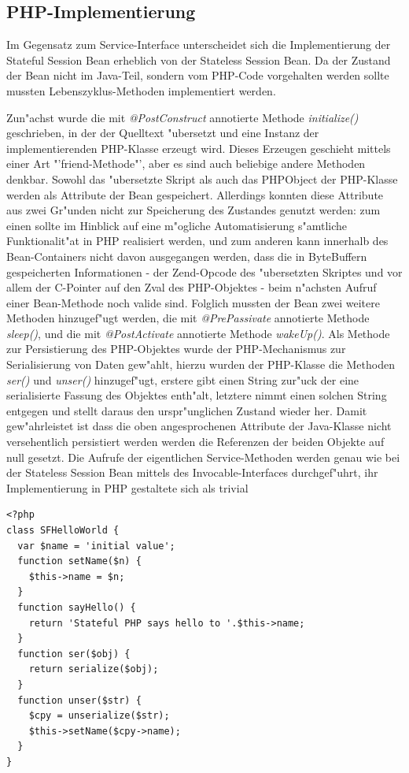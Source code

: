 \subsection{PHP-Implementierung}
\label{sec:chap2:sfsb:impl}

Im Gegensatz zum Service-Interface unterscheidet sich die Implementierung der Stateful Session Bean erheblich von der
Stateless Session Bean. Da der Zustand der Bean nicht im Java-Teil, sondern vom PHP-Code vorgehalten werden sollte
mussten Lebenszyklus-Methoden implementiert werden.

Zun"achst wurde die mit \emph{@PostConstruct} annotierte Methode \emph{initialize()} geschrieben, in der der Quelltext
"ubersetzt und eine Instanz der implementierenden PHP-Klasse erzeugt wird. Dieses Erzeugen geschieht mittels einer
Art "'friend-Methode"', aber es sind auch beliebige andere Methoden denkbar.
Sowohl das "ubersetzte Skript als auch das PHPObject der PHP-Klasse werden als Attribute der Bean gespeichert. 
Allerdings konnten diese Attribute aus zwei
Gr"unden nicht zur Speicherung des Zustandes genutzt werden: zum einen sollte im Hinblick auf eine m"ogliche
Automatisierung s"amtliche Funktionalit"at in PHP realisiert werden, und zum anderen kann innerhalb des Bean-Containers
nicht davon ausgegangen werden, dass die in ByteBuffern gespeicherten Informationen - der Zend-Opcode des "ubersetzten
Skriptes und vor allem der C-Pointer auf den Zval des PHP-Objektes - beim n"achsten Aufruf einer Bean-Methode noch valide 
sind. Folglich mussten der Bean zwei weitere Methoden hinzugef"ugt werden, die mit \emph{@PrePassivate} annotierte Methode
\emph{sleep()}, und die mit \emph{@PostActivate} annotierte Methode \emph{wakeUp()}. Als Methode zur Persistierung des
PHP-Objektes wurde der PHP-Mechanismus zur Serialisierung von Daten gew"ahlt, hierzu wurden der PHP-Klasse die Methoden
\emph{ser()} und \emph{unser()} hinzugef"ugt, erstere gibt einen String zur"uck der eine serialisierte Fassung des Objektes
enth"alt, letztere nimmt einen solchen String entgegen und stellt daraus den urspr"unglichen Zustand wieder her.
Damit gew"ahrleistet ist dass die oben angesprochenen Attribute der Java-Klasse nicht versehentlich persistiert werden 
werden die Referenzen der beiden Objekte auf null gesetzt.
Die Aufrufe der eigentlichen Service-Methoden werden genau wie bei der Stateless Session Bean mittels des Invocable-Interfaces
durchgef"uhrt, ihr Implementierung in PHP gestaltete sich als trivial
\begin{lstlisting}[caption=PHP-Implementierung]
<?php
class SFHelloWorld {
  var $name = 'initial value';
  function setName($n) {
    $this->name = $n;
  }
  function sayHello() {
    return 'Stateful PHP says hello to '.$this->name;
  }
  function ser($obj) {
    return serialize($obj);
  }
  function unser($str) {
    $cpy = unserialize($str);
    $this->setName($cpy->name);
  }
}
\end{lstlisting}


